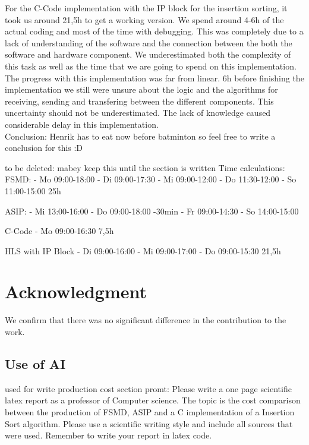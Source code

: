 \documentclass[conference]{IEEEtran}
\begin{document}
For the C-Code implementation with the IP block for the insertion sorting, it took us around 21,5h to get a working version. We spend around 4-6h of the actual coding and most of the time with debugging. This was completely due to a lack of understanding of the software and the connection between the both the software and hardware component. We underestimated both the complexity of this task as well as the time that we are going to spend on this implementation. The progress with this implementation was far from linear. 6h before finishing the implementation we still were unsure about the logic and the algorithms for receiving, sending and transfering between the different components. This uncertainty should not be underestimated. The lack of knowledge caused considerable delay in this implementation. \\
Conclusion: Henrik has to eat now before batminton so feel free to write a conclusion for this :D

to be deleted: 
mabey keep this until the section is written
Time calculations:
FSMD:
- Mo 09:00-18:00
- Di 09:00-17:30
- Mi 09:00-12:00
- Do 11:30-12:00
- So 11:00-15:00
25h

ASIP:
- Mi 13:00-16:00
- Do 09:00-18:00 -30min
- Fr 09:00-14:30
- So 14:00-15:00


C-Code
- Mo 09:00-16:30
7,5h

HLS with IP Block
- Di 09:00-16:00
- Mi 09:00-17:00
- Do 09:00-15:30
21,5h

\section*{Acknowledgment}

We confirm that there was no significant difference in the contribution to the work.

\printbibliography

\begin{appendices}
\section{Use of AI}
used for write production cost section promt: Please write a one page scientific latex report as a professor of Computer science. The topic is the cost comparison between the production of FSMD, ASIP and a C implementation of a Insertion Sort algorithm. Please use a scientific writing style and include all sources that were used. Remember to write your report in latex code.
\end{appendices}
\end{document}
